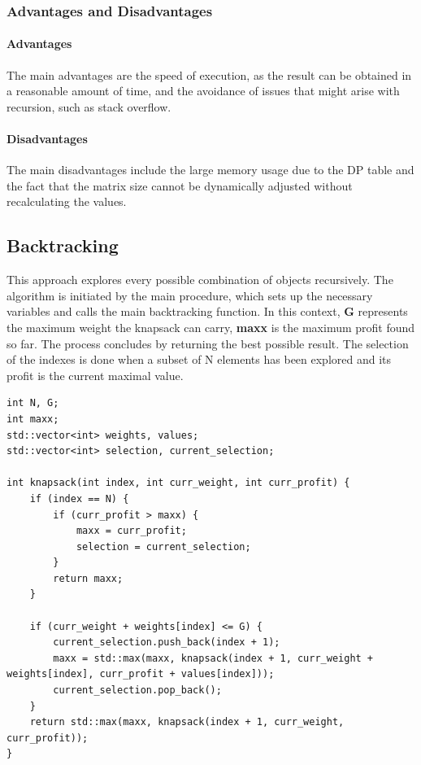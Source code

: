 \documentclass{llncs}
\begin{document}
\subsubsection{Advantages and Disadvantages}
\paragraph{Advantages}
The main advantages are the speed of execution, as the result can be obtained in a reasonable amount
of time, and the avoidance of issues that might arise with recursion, such as stack overflow.

\paragraph{Disadvantages}
The main disadvantages include the large memory usage due to the DP table and the fact that the 
matrix size cannot be dynamically adjusted without recalculating the values.

\subsection{Backtracking}

This approach explores every possible combination of objects recursively. The algorithm is initiated
by the main procedure, which sets up the necessary variables and calls the main backtracking
function. In this context, \textbf{G} represents the maximum weight the knapsack can carry, 
\textbf{maxx} is the maximum profit found so far. The process concludes by returning the best 
possible result. The selection of the indexes is done when a subset of N elements has been explored
and its profit is the current maximal value.


\begin{lstlisting}
int N, G;
int maxx;
std::vector<int> weights, values;
std::vector<int> selection, current_selection;

int knapsack(int index, int curr_weight, int curr_profit) {
	if (index == N) {
		if (curr_profit > maxx) {
			maxx = curr_profit;
			selection = current_selection;
		}
		return maxx;
	}

	if (curr_weight + weights[index] <= G) {
		current_selection.push_back(index + 1);
		maxx = std::max(maxx, knapsack(index + 1, curr_weight + weights[index], curr_profit + values[index]));
		current_selection.pop_back();
	}
	return std::max(maxx, knapsack(index + 1, curr_weight, curr_profit));
}
\end{lstlisting}
\end{document}
